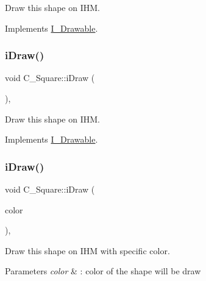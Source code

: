 Draw this shape on I\+HM. 



Implements \hyperlink{classI__Drawable_ae24c65000977a805f52ce032321cd86f}{I\+\_\+\+Drawable}.

\mbox{\label{classC__Square_ae6c51a7720576bcbb94b52584552df28}} 
\subsubsection{\texorpdfstring{i\+Draw()}{iDraw()}\hspace{0.1cm}{\footnotesize\ttfamily [2/4]}}
{\footnotesize\ttfamily void C\+\_\+\+Square\+::i\+Draw (\begin{DoxyParamCaption}{ }\end{DoxyParamCaption})\hspace{0.3cm}{\ttfamily [override]}, {\ttfamily [virtual]}}



Draw this shape on I\+HM. 



Implements \hyperlink{classI__Drawable_ae24c65000977a805f52ce032321cd86f}{I\+\_\+\+Drawable}.

\mbox{\label{classC__Square_a47a80c25bbeda17f17a8230127b4a5ed}} 
\subsubsection{\texorpdfstring{i\+Draw()}{iDraw()}\hspace{0.1cm}{\footnotesize\ttfamily [3/4]}}
{\footnotesize\ttfamily void C\+\_\+\+Square\+::i\+Draw (\begin{DoxyParamCaption}\item[{M\+L\+V\+\_\+\+Color}]{color }\end{DoxyParamCaption})\hspace{0.3cm}{\ttfamily [override]}, {\ttfamily [virtual]}}



Draw this shape on I\+HM with specific color. 


\begin{DoxyParams}{Parameters}
{\em color} & \+: color of the shape will be draw \\
\hline
\end{DoxyParams}


